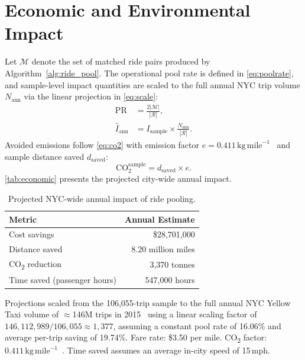 \section{Economic and Environmental Impact}

Let $\mathcal{M}$ denote the set of matched ride pairs produced by Algorithm~\ref{alg:ride_pool}. The operational pool rate is defined in \eqref{eq:poolrate}, and sample-level impact quantities are scaled to the full annual NYC trip volume $N_{\mathrm{ann}}$ via the linear projection in \eqref{eq:scale}:
\begin{align}
 \mathrm{PR}
 &= \frac{2|\mathcal{M}|}{|\mathcal{R}|},
 \label{eq:poolrate} \\
 \widehat{I}_{\mathrm{ann}}
 &= I_{\mathrm{sample}}
 \times \frac{N_{\mathrm{ann}}}{|\mathcal{R}|}.
 \label{eq:scale}
\end{align}
Avoided emissions follow \eqref{eq:co2} with emission factor $e{=}0.411\,\mathrm{kg\,mile}^{-1}$~\parencite{epa_emission_factors} and sample distance saved $d_{\mathrm{saved}}$:
\begin{equation}
 \mathrm{CO}_{2}^{\mathrm{sample}} = d_{\mathrm{saved}} \times e.
 \label{eq:co2}
\end{equation}
\autoref{tab:economic} presents the projected city-wide annual impact.
\begin{table}[!htb]
\centering
\caption{Projected NYC-wide annual impact of ride pooling.\label{tab:economic}}
\begin{threeparttable}
\begin{tabularx}{\textwidth}{>{\raggedright\arraybackslash}X r}
\toprule
\textbf{Metric} & \textbf{Annual Estimate} \\
\midrule
Cost savings & \$28,701,000 \\
Distance saved & 8.20 million miles \\
CO\textsubscript{2} reduction & 3,370 tonnes \\
Time saved (passenger hours) & 547,000 hours \\
\bottomrule
\end{tabularx}
\begin{tablenotes}
 \small
 \item Projections scaled from the 106,055-trip sample to the full annual NYC Yellow Taxi volume of $\approx$146M trips in 2015~\parencite{nyc_opendata_2015,tlc_annual_2015} using a linear scaling factor of $146{,}112{,}989 / 106{,}055 \approx 1{,}377$, assuming a constant pool rate of 16.06\% and average per-trip saving of 19.74\%. Fare rate: \$3.50 per mile. CO\textsubscript{2} factor: $0.411\,\mathrm{kg\,mile}^{-1}$~\parencite{epa_emission_factors}. Time saved assumes an average in-city speed of 15\,mph.
\end{tablenotes}
\end{threeparttable}
\end{table}

